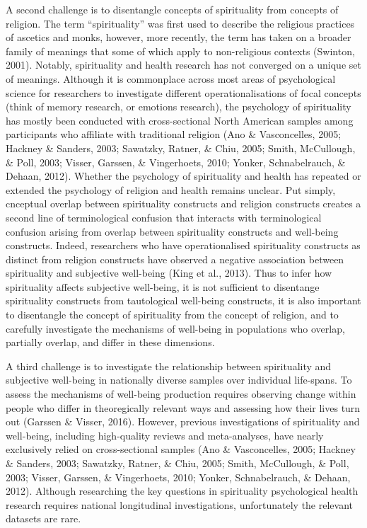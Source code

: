 \documentclass[
  english,
  man,floatsintext]{apa6}
\begin{document}
A second challenge is to disentangle concepts of spirituality from concepts of religion. The term ``spirituality'' was first used to describe the religious practices of ascetics and monks, however, more recently, the term has taken on a broader family of meanings that some of which apply to non-religious contexts (Swinton, 2001). Notably, spirituality and health research has not converged on a unique set of meanings. Although it is commonplace across most areas of psychological science for researchers to investigate different operationalisations of focal concepts (think of memory research, or emotions research), the psychology of spirituality has mostly been conducted with cross-sectional North American samples among participants who affiliate with traditional religion (Ano \& Vasconcelles, 2005; Hackney \& Sanders, 2003; Sawatzky, Ratner, \& Chiu, 2005; Smith, McCullough, \& Poll, 2003; Visser, Garssen, \& Vingerhoets, 2010; Yonker, Schnabelrauch, \& Dehaan, 2012). Whether the psychology of spirituality and health has repeated or extended the psychology of religion and health remains unclear. Put simply, cnceptual overlap between spirituality constructs and religion constructs creates a second line of terminological confusion that interacts with terminological confusion arising from overlap between spirituality constructs and well-being constructs. Indeed, researchers who have operationalised spirituality constructs as distinct from religion constructs have observed a negative association between spirituality and subjective well-being (King et al., 2013). Thus to infer how spirituality affects subjective well-being, it is not sufficient to disentange spirituality constructs from tautological well-being constructs, it is also important to disentangle the concept of spirituality from the concept of religion, and to carefully investigate the mechanisms of well-being in populations who overlap, partially overlap, and differ in these dimensions.

A third challenge is to investigate the relationship between spirituality and subjective well-being in nationally diverse samples over individual life-spans. To assess the mechanisms of well-being production requires observing change within people who differ in theoregically relevant ways and assessing how their lives turn out (Garssen \& Visser, 2016). However, previous investigations of spirituality and well-being, including high-quality reviews and meta-analyses, have nearly exclusively relied on cross-sectional samples (Ano \& Vasconcelles, 2005; Hackney \& Sanders, 2003; Sawatzky, Ratner, \& Chiu, 2005; Smith, McCullough, \& Poll, 2003; Visser, Garssen, \& Vingerhoets, 2010; Yonker, Schnabelrauch, \& Dehaan, 2012). Although researching the key questions in spirituality psychological health research requires national longitudinal investigations, unfortunately the relevant datasets are rare.
\end{document}
